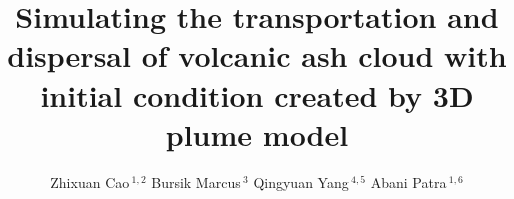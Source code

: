 \documentclass[utf8]{frontiersSCNS} %
\def\firstAuthorLast{Z. Cao {et~al.}} %
\def\Authors{Zhixuan Cao\,$^{1,2}$ Bursik Marcus\,$^{3}$  Qingyuan Yang\,$^{4,5}$ Abani Patra\,$^{1,6}$}
\begin{document}
\onecolumn
{}

\title[VATDs of Volcanic Ash Based on 3D Plume Model]{Simulating the transportation and dispersal of volcanic ash cloud with initial condition created by 3D plume model} 

\author[\firstAuthorLast ]{\Authors} %
\address{} %
\correspondance{} %

\extraAuth{}%


\maketitle
\end{document}

